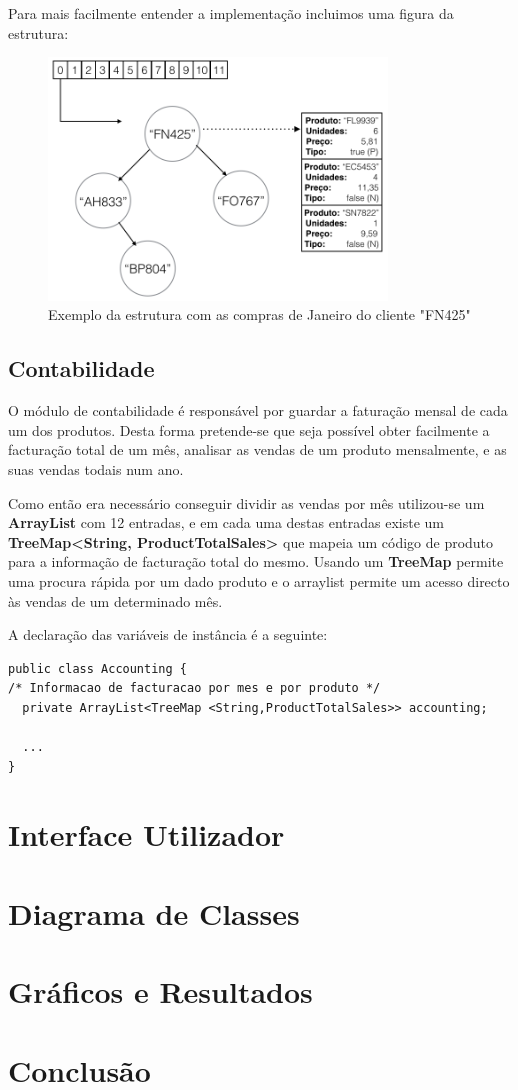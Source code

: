 \documentclass[10pt] {article}
\begin{document}
Para mais facilmente entender a implementação incluimos uma figura da estrutura:

\begin{figure}[ht!]
\centering
\includegraphics[width=90mm]{sales.png}
\caption{Exemplo da estrutura com as compras de Janeiro do cliente "FN425"}
\label{fig:sales}
\end{figure}

\subsection{Contabilidade}

O módulo de contabilidade é responsável por guardar a faturação mensal de cada um dos produtos.
Desta forma pretende-se que seja possível obter facilmente a facturação total de um mês, analisar as vendas de um produto mensalmente, e as suas vendas todais num ano.

Como então era necessário conseguir dividir as vendas por mês utilizou-se um \textbf{ArrayList} com 12 entradas, e
em cada uma destas entradas existe um \textbf{TreeMap\textless String, ProductTotalSales\textgreater} que mapeia um código de produto para a informação de facturação total do mesmo. Usando um \textbf{TreeMap} permite uma
procura rápida por um dado produto e o arraylist permite um acesso directo às vendas de um determinado mês.

A declaração das variáveis de instância é a seguinte:

\begin{lstlisting}
public class Accounting {
/* Informacao de facturacao por mes e por produto */
  private ArrayList<TreeMap <String,ProductTotalSales>> accounting;

  ...
}
\end{lstlisting}
\newpage
\section{Interface Utilizador}

\newpage
\section{Diagrama de Classes}

\newpage
\section{Gráficos e Resultados}

\newpage
\section{Conclusão}
\end{document}
